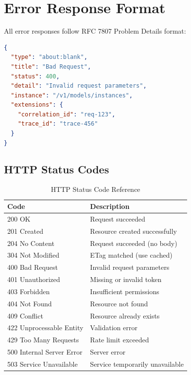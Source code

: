 \section{Error Response Format}
\label{app:api:errors}

All error responses follow RFC 7807 Problem Details format:

\begin{lstlisting}[language=json]
{
  "type": "about:blank",
  "title": "Bad Request",
  "status": 400,
  "detail": "Invalid request parameters",
  "instance": "/v1/models/instances",
  "extensions": {
    "correlation_id": "req-123",
    "trace_id": "trace-456"
  }
}
\end{lstlisting}

\subsection{HTTP Status Codes}

\begin{table}[ht]
\centering
\caption{HTTP Status Code Reference}
\label{tab:http-status-codes}
\small
\begin{tabularx}{\textwidth}{lX}
    \hline
    \textbf{Code} & \textbf{Description} \\
    \hline
    200 OK & Request succeeded \\
    201 Created & Resource created successfully \\
    204 No Content & Request succeeded (no body) \\
    304 Not Modified & ETag matched (use cached) \\
    400 Bad Request & Invalid request parameters \\
    401 Unauthorized & Missing or invalid token \\
    403 Forbidden & Insufficient permissions \\
    404 Not Found & Resource not found \\
    409 Conflict & Resource already exists \\
    422 Unprocessable Entity & Validation error \\
    429 Too Many Requests & Rate limit exceeded \\
    500 Internal Server Error & Server error \\
    503 Service Unavailable & Service temporarily unavailable \\
    \hline
\end{tabularx}
\end{table}

